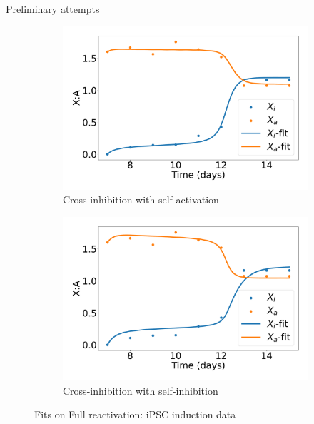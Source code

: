 \documentclass[aspectratio=169,9pt]{beamer}
\begin{document}
    \begin{frame}{Preliminary attempts}  
        \begin{figure}[h]\ContinuedFloat
            \begin{subfigure}[b]{0.49\textwidth}
                \centering
                \includegraphics[width=\textwidth]{IIAA-iPSC_timeshifted-timeseries}
                \caption{Cross-inhibition with self-activation}
            \end{subfigure}
            \begin{subfigure}[b]{0.49\textwidth}
                \centering
                \includegraphics[width=\textwidth]{IIII-iPSC_timeshifted-timeseries}
                \caption{Cross-inhibition with self-inhibition}
            \end{subfigure}
            \caption{Fits on Full reactivation: iPSC induction data}
        \end{figure}
    \end{frame}
\end{document}
